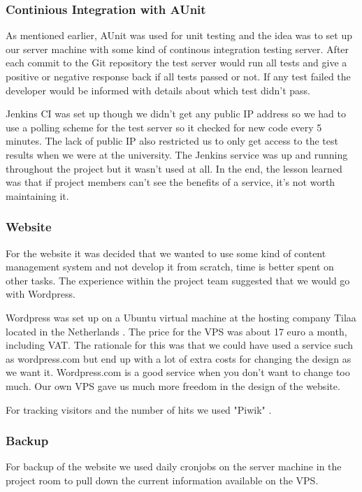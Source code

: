 \subsubsection{Continious Integration with AUnit}
As mentioned earlier, AUnit was used for unit testing and the idea was to set up
our server machine with some kind of continous integration testing server. After
each commit to the Git repository the test server would run all tests and give
a positive or negative response back if all tests passed or not. If any test failed
the developer would be informed with details about which test didn't pass.

Jenkins CI \cite{web:jenkins} was set up though we didn't get any public IP address so we had to use
a polling scheme for the test server so it checked for new code every 5 minutes.
The lack of public IP also restricted us to only get access to the test results
when we were at the university. The Jenkins service was up and running throughout the
project but it wasn't used at all. In the end, the lesson learned was that
if project members can't see the benefits
of a service, it's not worth maintaining it.

\subsubsection{Website}
For the website it was decided that we wanted to use some kind of content management
system and not develop it from scratch, time is better spent on other tasks.
The experience within the project team suggested that we would go with Wordpress.

Wordpress was set up on a Ubuntu virtual machine at the hosting company Tilaa
located in the Netherlands \cite{web:tilaa}. The price for the VPS was about 17 euro
a month, including VAT. The rationale for this was that we could have used a service such
as wordpress.com but end up with a lot of extra costs for changing the design as we
want it. Wordpress.com is a good service when you don't want to change too much.
Our own VPS gave us much more freedom in the design of the website.

For tracking visitors and the number of hits we used "Piwik" \cite{web:piwik}.

\subsubsection{Backup}
For backup of the website we used daily cronjobs on the server machine in the project
room to pull down the current information available on the VPS.
